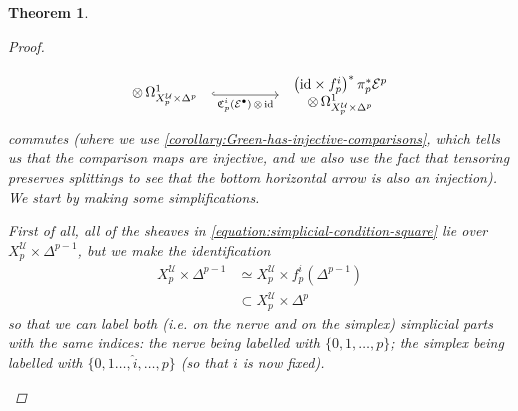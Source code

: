 \documentclass[11pt,fleqn]{article}
\theoremstyle{plain}
\newtheorem{theorem}{Theorem}[subsection]
\theoremstyle{definition}
\theoremstyle{remark}
\numberwithin{equation}{theorem}
\newcommand{\cover}{\mathcal{U}}
\newcommand{\id}{\mathrm{id}}
\newcommand{\nerve}[1]{X_{#1}^\cover}
\newcommand{\nervesimplex}[1]{\nerve{#1}\times\Delta^{#1}}
\newcommand{\comparison}[1]{\mathfrak{C}_{#1}}
\begin{document}
\begin{theorem}
\begin{proof}
\begin{enumerate}
\begin{equation}
\begin{tikzcd}[column sep=huge,row sep=7em]
\begin{tabular}{c}
                                    $\otimes\,\Omega^1_{\nervesimplex{p}}$
                                \end{tabular}
                                    \ar[r,hook,swap,"\comparison{p}^i(\mathcal{E}^\bullet)\,\otimes\,\id"]
                                &\begin{tabular}{c}
                                    $\left(\id\times f_p^i\right)^*\pi_p^*{\mathcal{E}^p}$\\
                                    $\otimes\,\Omega^1_{\nervesimplex{p}}$
                                \end{tabular}
                            \end{tikzcd}
                        \end{equation}
                        commutes (where we use \cref{corollary:Green-has-injective-comparisons}, which tells us that the comparison maps are injective, and we also use the fact that tensoring preserves splittings to see that the bottom horizontal arrow is also an injection).
                        We start by making some simplifications.

                        First of all, all of the sheaves in \cref{equation:simplicial-condition-square} lie over $\nerve{p}\times\Delta^{p-1}$, but we make the identification
                        \begin{align*}
                            \nerve{p}\times\Delta^{p-1}
                            &\simeq
                            \nerve{p}\times f_p^i\left(\Delta^{p-1}\right)\\
                            &\subset
                            \nervesimplex{p}
                        \end{align*}
                        so that we can label \emph{both} (i.e. on the nerve and on the simplex) simplicial parts with the same indices: the nerve being labelled with $\{0,1,\ldots,p\}$; the simplex being labelled with $\{0,1\ldots,\hat{i},\ldots,p\}$ (so that $i$ is now fixed).


\end{enumerate}
\end{proof}
\end{theorem}
\end{document}

